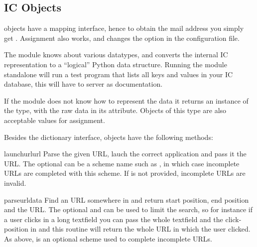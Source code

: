 \subsection{IC Objects}

 objects have a mapping interface, hence to obtain the mail
address you simply get . Assignment also
works, and changes the option in the configuration file.

The module knows about various datatypes, and converts the internal IC
representation to a ``logical'' Python data structure. Running the
 module standalone will run a test program that lists all
keys and values in your IC database, this will have to server as
documentation.

If the module does not know how to represent the data it returns an
instance of the  type, with the raw data in its
 attribute. Objects of this type are also acceptable values
for assignment.

Besides the dictionary interface,  objects have the
following methods:


\begin{methoddesc}{launchurl}{url}
Parse the given URL, lauch the correct application and pass it the
URL. The optional  can be a scheme name such as
, in which case incomplete URLs are completed with this
scheme.  If  is not provided, incomplete URLs are invalid.
\end{methoddesc}

\begin{methoddesc}{parseurl}{data}
Find an URL somewhere in  and return start position, end
position and the URL. The optional  and  can be
used to limit the search, so for instance if a user clicks in a long
textfield you can pass the whole textfield and the click-position in
 and this routine will return the whole URL in which the
user clicked.  As above,  is an optional scheme used to
complete incomplete URLs.
\end{methoddesc}


